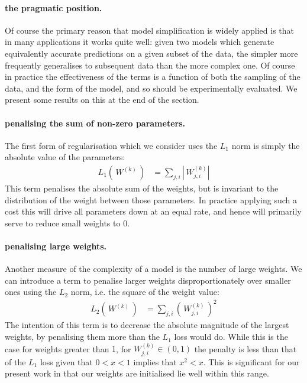 \documentclass[msc]{infthesis}
\newcommand{\weights}[2][]{W_{#1}^{(#2)}}
\newcommand{\of}[1]{\left(\,{#1}\,\right)}
\newcommand{\norm}[1]{\left\lvert\,{#1}\right\rvert}
\begin{document}
\paragraph*{the pragmatic position.}
\label{sec:classification:2-4-1-3} Of course the primary reason that model simplification is
widely applied is that in many applications it works quite well: given two models which generate
equivalently accurate predictions on a given subset of the data, the simpler more frequently 
generalises to subsequent data than the more complex one.\cite{bishop:2006:PRML}  Of course in practice
the effectiveness of the terms is a function of both the sampling of the data, and the form of the
model, and so should be experimentally evaluated.  We present some results on this at the end of the
section.


\paragraph*{penalising the sum of non-zero parameters.}
\label{sec:classification:2-4-2-1}
The first form of regularisation which we consider uses the \(L_1\) norm is simply the 
absolute value of the parameters:
%
\begin{align}
L_1\of{\weights{k}} 
&=
\sum_{j,i} \norm{ \weights[j,i]{k} }
\end{align}
%
This term penalises the absolute sum of the weights, but is invariant to the distribution of the
weight between those parameters.  In practice applying such a cost this will drive all parameters
down at an equal rate, and hence will primarily serve to reduce small weights to 0.



\paragraph*{penalising large weights.}
\label{sec:classification:2-4-3-1}
Another measure of the complexity of a model is the number of large weights.  We can introduce a
term to penalise larger weights disproportionately over smaller ones using the \(L_2\) norm, i.e.
the square of the weight value:
%
\begin{align}
L_2 \of{ \weights{k} }
&=
\sum_{j,i} \of{ \weights[j,i]{k} }^2
\end{align}
%
The intention of this term is to decrease the absolute magnitude of the largest weights, by penalising
them more than the \(L_1\) loss would do.  While this is the case for weights greater than \(1\),
for \(\weights[j,i]{k} \in (0, 1)\) the penalty is less than that of the \(L_1\) loss given that
\(0 < x < 1\) implies that \(x^2 < x\).  This is significant for our present work in that our weights
are initialised lie well within this range.
\end{document}

